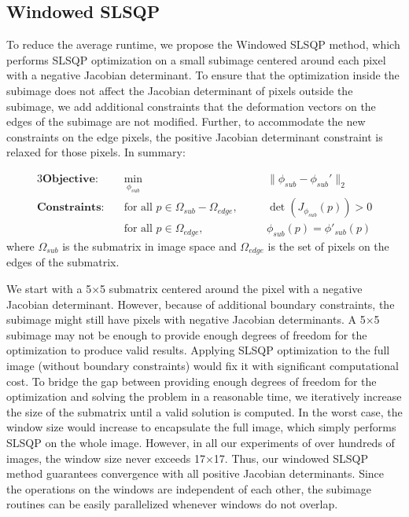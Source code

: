 \documentclass[lettersize,journal]{IEEEtran}
\begin{document}
\subsection{Windowed SLSQP}
To reduce the average runtime, we propose the Windowed SLSQP method, which performs SLSQP optimization on a small subimage centered around each pixel with a negative Jacobian determinant. To ensure that the optimization inside the subimage does not affect the Jacobian determinant of pixels outside the subimage, we add additional constraints that the deformation vectors on the edges of the subimage are not modified. Further, to accommodate the new constraints on the edge pixels, the positive Jacobian determinant constraint is relaxed for those pixels. In summary:

\begin{alignat}{3}
\textbf{Objective:} \quad & \min_{\phi_{sub}} && \quad \|\phi_{sub} - \phi_{sub}'\|_2 \label{eq:iter_objective_function} \\
\textbf{Constraints:} \quad & \text{for all } p \in \Omega_{sub}-\Omega_{edge}, && \quad \det(J_{\phi_{sub}}(p)) > 0 \\
\quad & \text{for all } p \in \Omega_{edge}, && \quad \phi_{sub}(p) = \phi'_{sub}(p) 
\label{eq:iter_opt_constraint}
\end{alignat}
where $\Omega_{sub}$ is the submatrix in image space and $\Omega_{edge}$ is the set of pixels on the edges of the submatrix.

We start with a 5×5 submatrix centered around the pixel with a negative Jacobian determinant. However, because of additional boundary constraints, the subimage might still have pixels with negative Jacobian determinants. A 5×5 subimage may not be enough to provide enough degrees of freedom for the optimization to produce valid results. Applying SLSQP optimization to the full image (without boundary constraints) would fix it with significant computational cost. To bridge the gap between providing enough degrees of freedom for the optimization and solving the problem in a reasonable time, we iteratively increase the size of the submatrix until a valid solution is computed. In the worst case, the window size would increase to encapsulate the full image, which simply performs SLSQP on the whole image. However, in all our experiments of over hundreds of images, the window size never exceeds 17×17. Thus, our windowed SLSQP method guarantees convergence with all positive Jacobian determinants. Since the operations on the windows are independent of each other, the subimage routines can be easily parallelized whenever windows do not overlap.
\end{document}
